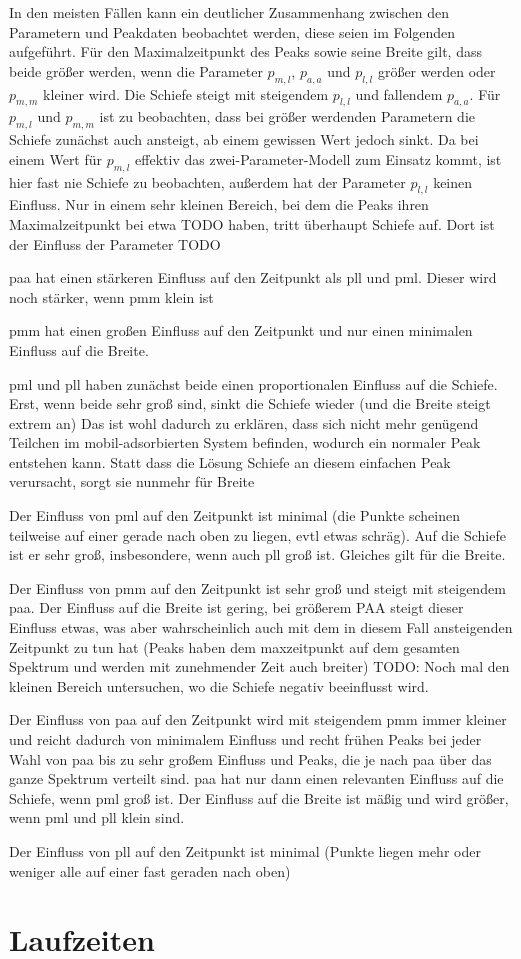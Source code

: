 In den meisten Fällen kann ein deutlicher Zusammenhang zwischen den Parametern und Peakdaten beobachtet werden, diese seien im Folgenden aufgeführt.
Für den Maximalzeitpunkt des Peaks sowie seine Breite gilt, dass beide größer werden, wenn die Parameter $p_{m,l}$, $p_{a,a}$ und $p_{l,l}$ größer werden oder $p_{m,m}$ kleiner wird. 
Die Schiefe steigt mit steigendem $p_{l,l}$ und fallendem $p_{a,a}$. Für $p_{m,l} \text{ und } p_{m,m}$ ist zu beobachten, dass bei größer werdenden Parametern die Schiefe zunächst auch ansteigt, ab einem gewissen Wert jedoch sinkt. 
Da bei einem Wert für $p_{m,l}$ effektiv das zwei-Parameter-Modell zum Einsatz kommt, ist hier fast nie Schiefe zu beobachten, außerdem hat der Parameter $p_{l,l}$ keinen Einfluss. Nur in einem sehr kleinen Bereich, bei dem die Peaks ihren Maximalzeitpunkt bei etwa TODO haben, tritt überhaupt Schiefe auf. Dort ist der Einfluss der Parameter TODO

paa hat einen stärkeren Einfluss auf den Zeitpunkt als pll und pml. Dieser wird noch stärker, wenn pmm klein ist

pmm hat einen großen Einfluss auf den Zeitpunkt und nur einen minimalen Einfluss auf die Breite.

pml und pll haben zunächst beide einen proportionalen Einfluss auf die Schiefe. Erst, wenn beide sehr groß sind, sinkt die Schiefe wieder (und die Breite steigt extrem an) Das ist wohl dadurch zu erklären, dass sich nicht mehr genügend Teilchen im mobil-adsorbierten System befinden, wodurch ein normaler Peak entstehen kann. Statt dass die Lösung Schiefe an diesem einfachen Peak verursacht, sorgt sie nunmehr für Breite

Der Einfluss von pml auf den Zeitpunkt ist minimal (die Punkte scheinen teilweise auf einer gerade nach oben zu liegen, evtl etwas schräg). Auf die Schiefe ist er sehr groß, insbesondere, wenn auch pll groß ist. Gleiches gilt für die Breite.

Der Einfluss von pmm auf den Zeitpunkt ist sehr groß und steigt mit steigendem paa. Der Einfluss auf die Breite ist gering, bei größerem PAA steigt dieser Einfluss etwas, was aber wahrscheinlich auch mit dem in diesem Fall ansteigenden Zeitpunkt zu tun hat (Peaks haben dem maxzeitpunkt auf dem gesamten Spektrum und werden mit zunehmender Zeit auch breiter) TODO: Noch mal den kleinen Bereich untersuchen, wo die Schiefe negativ beeinflusst wird.

Der Einfluss von paa auf den Zeitpunkt wird mit steigendem pmm immer kleiner und reicht dadurch von minimalem Einfluss und recht frühen Peaks bei jeder Wahl von paa bis zu sehr großem Einfluss und Peaks, die je nach paa über das ganze Spektrum verteilt sind. paa hat nur dann einen relevanten Einfluss auf die Schiefe, wenn pml groß ist. Der Einfluss auf die Breite ist mäßig und wird größer, wenn pml und pll klein sind.

Der Einfluss von pll auf den Zeitpunkt ist minimal (Punkte liegen mehr oder weniger alle auf einer fast geraden nach oben)

\section{Laufzeiten}

